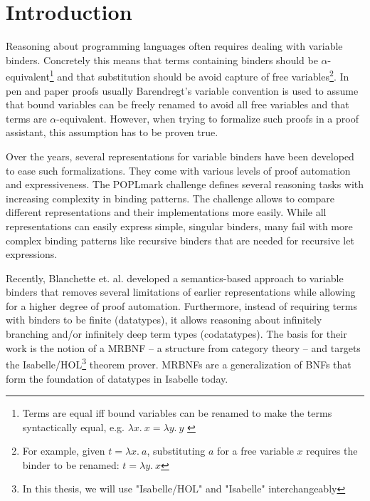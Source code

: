 \chapter{Introduction}\label{chapter:introduction}

Reasoning about programming languages often requires dealing with variable binders. Concretely this means that terms containing binders should be $\alpha$-equivalent\footnote{Terms are equal iff bound variables can be renamed to make the terms syntactically equal, e.g. $\lambda x. \: x = \lambda y. \: y$ \label{ftn:alpha-equivalence}} and that substitution should be avoid capture of free variables\footnote{For example, given $t = \lambda x. \: a$, substituting $a$ for a free variable $x$ requires the binder to be renamed: $t = \lambda y.\: x$}. In pen and paper proofs usually Barendregt's variable convention\cite{variable_convention} is used to assume that bound variables can be freely renamed to avoid all free variables and that terms are $\alpha$-equivalent. However, when trying to formalize such proofs in a proof assistant, this assumption has to be proven true.

Over the years, several representations for variable binders have been developed to ease such formalizations. They come with various levels of proof automation and expressiveness. The POPLmark challenge\cite{poplmark} defines several reasoning tasks with increasing complexity in binding patterns. The challenge allows to compare different representations and their implementations more easily. While all representations can easily express simple, singular binders, many fail with more complex binding patterns like recursive binders that are needed for recursive let expressions.

Recently, Blanchette et. al.\cite{mrbnfs} developed a semantics-based approach to variable binders that removes several limitations of earlier representations while allowing for a higher degree of proof automation. Furthermore, instead of requiring terms with binders to be finite (datatypes), it allows reasoning about infinitely branching and/or infinitely deep term types (codatatypes). The basis for their work is the notion of a \acf{MRBNF} -- a structure from category theory -- and targets the Isabelle/HOL\footnote{In this thesis, we will use "Isabelle/HOL" and "Isabelle" interchangeably}\cite{isabelle} theorem prover. \acp{MRBNF} are a generalization of \acp{BNF} that form the foundation of datatypes in Isabelle today\cite{isabelle_datatypes}.

\pagebreak %

